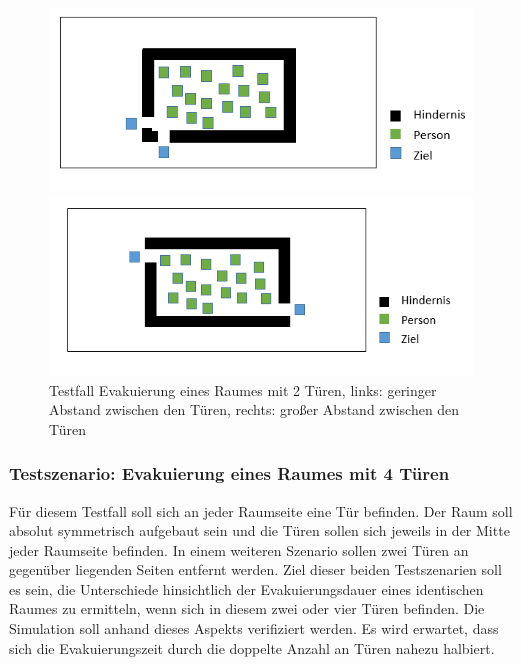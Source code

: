 \begin{figure}[!htb]
	\centering
	\begin{minipage}{.5\textwidth}
		\centering
		\includegraphics[width=\textwidth]{abbildungen/Test_Evakuierung2_Nebeneinander.png}
	\end{minipage}%
	\begin{minipage}{0.5\textwidth}
		\centering
		\includegraphics[width=\textwidth]{abbildungen/Test_Evakuierung2_NebeneinanderMax.png}
	\end{minipage}
	\label{fig:AnforderungenTestEvak2TürNebeneinander}
	\caption{Testfall Evakuierung eines Raumes mit 2 Türen, links: geringer Abstand zwischen den Türen, rechts: großer Abstand zwischen den Türen}
\end{figure}

\subsubsection{Testszenario: Evakuierung eines Raumes mit 4 Türen}
Für diesem Testfall soll sich an jeder Raumseite eine Tür befinden. Der Raum soll absolut symmetrisch aufgebaut sein und die Türen sollen sich jeweils in der Mitte jeder Raumseite befinden. In einem weiteren Szenario sollen zwei Türen an gegenüber liegenden Seiten entfernt werden. Ziel dieser beiden Testszenarien soll es sein, die Unterschiede hinsichtlich der Evakuierungsdauer eines identischen Raumes zu ermitteln, wenn sich in diesem zwei oder vier Türen befinden. Die Simulation soll anhand dieses Aspekts verifiziert werden. Es wird erwartet, dass sich die Evakuierungszeit durch die doppelte Anzahl an Türen nahezu halbiert.

